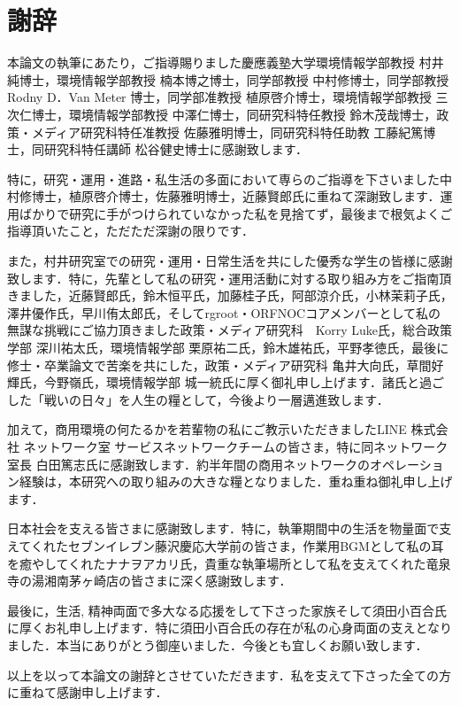 \chapter*{謝辞}
\label{thanks}

本論文の執筆にあたり，ご指導賜りました慶應義塾大学環境情報学部教授 村井純博士，環境情報学部教授 楠本博之博士，同学部教授 中村修博士，同学部教授 Rodny D．Van Meter 博士，同学部准教授 植原啓介博士，環境情報学部教授 三次仁博士，環境情報学部教授 中澤仁博士，同研究科特任教授 鈴木茂哉博士，政策・メディア研究科特任准教授 佐藤雅明博士，同研究科特任助教 工藤紀篤博士，同研究科特任講師 松谷健史博士に感謝致します．

特に，研究・運用・進路・私生活の多面において専らのご指導を下さいました中村修博士，植原啓介博士，佐藤雅明博士，近藤賢郎氏に重ねて深謝致します．運用ばかりで研究に手がつけられていなかった私を見捨てず，最後まで根気よくご指導頂いたこと，ただただ深謝の限りです．


また，村井研究室での研究・運用・日常生活を共にした優秀な学生の皆様に感謝致します．特に，先輩として私の研究・運用活動に対する取り組み方をご指南頂きました，近藤賢郎氏，鈴木恒平氏，加藤桂子氏，阿部涼介氏，小林茉莉子氏，澤井優作氏，早川侑太郎氏，そしてrgroot・ORFNOCコアメンバーとして私の無謀な挑戦にご協力頂きました政策・メディア研究科　Korry Luke氏，総合政策学部 深川祐太氏，環境情報学部 栗原祐二氏，鈴木雄祐氏，平野孝徳氏，最後に修士・卒業論文で苦楽を共にした，政策・メディア研究科 亀井大向氏，草間好輝氏，今野嶺氏，環境情報学部 城一統氏に厚く御礼申し上げます．諸氏と過ごした「戦いの日々」を人生の糧として，今後より一層邁進致します．

加えて，商用環境の何たるかを若輩物の私にご教示いただきましたLINE 株式会社 ネットワーク室 サービスネットワークチームの皆さま，特に同ネットワーク室長 白田篤志氏に感謝致します．約半年間の商用ネットワークのオペレーション経験は，本研究への取り組みの大きな糧となりました．重ね重ね御礼申し上げます．

日本社会を支える皆さまに感謝致します．特に，執筆期間中の生活を物量面で支えてくれたセブンイレブン藤沢慶応大学前の皆さま，作業用BGMとして私の耳を癒やしてくれたナナヲアカリ氏，貴重な執筆場所として私を支えてくれた竜泉寺の湯湘南茅ヶ崎店の皆さまに深く感謝致します．



最後に，生活, 精神両面で多大なる応援をして下さった家族そして須田小百合氏に厚くお礼申し上げます．特に須田小百合氏の存在が私の心身両面の支えとなりました．本当にありがとう御座いました．今後とも宜しくお願い致します．

以上を以って本論文の謝辞とさせていただきます．私を支えて下さった全ての方に重ねて感謝申し上げます．



